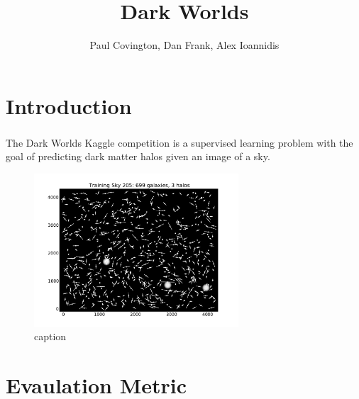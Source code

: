 \documentclass{article}
\title{Dark Worlds} \author{Paul Covington, Dan Frank, Alex Ioannidis}
\begin{document}
\maketitle

\section{Introduction}
The Dark Worlds Kaggle \textsuperscript{\texttrademark} competition is a supervised learning problem with the goal of predicting dark matter halos given an image of a sky.

\begin{figure}[htbp]
  \centering
  \label{fig:sky}
  \includegraphics[width=3in]{figs/sky.pdf}
  \caption{caption}
\end{figure}

\section{Evaulation Metric}
\end{document}
